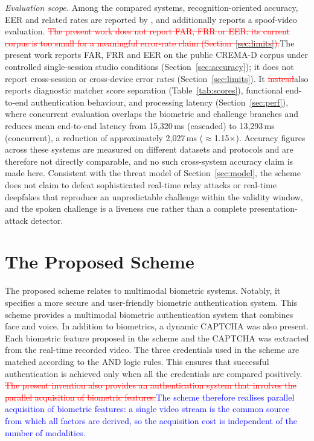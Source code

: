 \documentclass[10pt,journal,compsoc]{IEEEtran}
\begin{document}
{\emph{Evaluation scope.} Among the compared systems, recognition-oriented accuracy, EER and related rates are reported by \cite{jha2024featurefusion,aanjankumar2025smartcity,jha2025ensemble,chen2026twostep,jha2025challenge}, and \cite{jha2025challenge} additionally reports a spoof-video evaluation. \textcolor{red}{\sout{The present work does not report FAR, FRR or EER: its current corpus is too small for a meaningful error-rate claim (Section~\ref{sec:limits}).}}\textcolor{revpink}{The present work reports FAR, FRR and EER on the public CREMA-D corpus under controlled single-session studio conditions (Section~\ref{sec:accuracy}); it does not report cross-session or cross-device error rates (Section~\ref{sec:limits}).} It \textcolor{red}{\sout{instead}}\textcolor{revpink}{also} reports diagnostic matcher score separation (Table~\ref{tab:scores}), functional end-to-end authentication behaviour, and processing latency (Section~\ref{sec:perf}), where concurrent evaluation overlaps the biometric and challenge branches and reduces mean end-to-end latency from 15{,}320\,ms (cascaded) to 13{,}293\,ms (concurrent), a reduction of approximately 2{,}027\,ms ($\approx$1.15$\times$). Accuracy figures across these systems are measured on different datasets and protocols and are therefore not directly comparable, and no such cross-system accuracy claim is made here. Consistent with the threat model of Section~\ref{sec:model}, the scheme does not claim to defeat sophisticated real-time relay attacks or real-time deepfakes that reproduce an unpredictable challenge within the validity window, and the spoken challenge is a liveness cue rather than a complete presentation-attack detector.
}

\section{The Proposed Scheme}
The proposed scheme relates to multimodal biometric systems. Notably, it specifies a more secure and user-friendly biometric authentication system. This scheme provides a multimodal biometric authentication system that combines face and voice. In addition to biometrics, a dynamic CAPTCHA was also present. Each biometric feature proposed in the scheme and the CAPTCHA was extracted from the real-time recorded video. The three credentials used in the scheme are matched according to the AND logic rules. This ensures that successful authentication is achieved only when all the credentials are compared positively.
\textcolor{red}{\sout{The present invention also provides an authentication system that involves the parallel acquisition of biometric features.}}\textcolor{blue}{The scheme therefore realises parallel acquisition of biometric features: a single video stream is the common source from which all factors are derived, so the acquisition cost is independent of the number of modalities.}
\\
\end{document}
